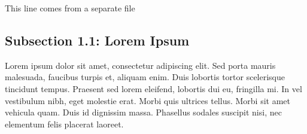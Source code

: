 
This line comes from a separate file

\subsection[S1.1: First again]{Subsection 1.1: Lorem Ipsum}

Lorem ipsum dolor sit amet, consectetur adipiscing elit. Sed porta mauris malesuada, faucibus turpis et, aliquam enim. Duis lobortis tortor scelerisque tincidunt tempus. Praesent sed lorem eleifend, lobortis dui eu, fringilla mi. In vel vestibulum nibh, eget molestie erat. Morbi quis ultrices tellus. Morbi sit amet vehicula quam. Duis id dignissim massa. Phasellus sodales suscipit nisi, nec elementum felis placerat laoreet.
